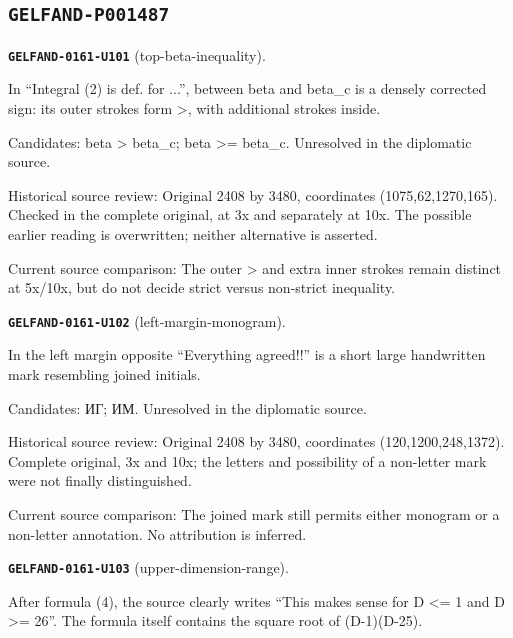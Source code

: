 \subsection*{\texttt{GELFAND-P001487}}
\par\noindent\leavevmode{}\label{GELFAND-0161-U101}\label{GELFAND-P001487:top-beta-inequality}\textbf{\texttt{GELFAND-0161-U101}} (top-beta-inequality).\nopagebreak[4]\par
In “Integral (2) is def. for ...”, between beta and beta\_c is a densely corrected sign: its outer strokes form >, with additional strokes inside.\par
Candidates: beta > beta\_c; beta >= beta\_c. Unresolved in the diplomatic source.\par
Historical source review: Original 2408 by 3480, coordinates (1075,62,1270,165). Checked in the complete original, at 3x and separately at 10x. The possible earlier reading is overwritten; neither alternative is asserted.\par
Current source comparison: The outer > and extra inner strokes remain distinct at 5x/10x, but do not decide strict versus non-strict inequality.\par\medskip
\par\noindent\leavevmode{}\label{GELFAND-0161-U102}\label{GELFAND-P001487:left-margin-monogram}\textbf{\texttt{GELFAND-0161-U102}} (left-margin-monogram).\nopagebreak[4]\par
In the left margin opposite “Everything agreed!!” is a short large handwritten mark resembling joined initials.\par
Candidates: ИГ; ИМ. Unresolved in the diplomatic source.\par
Historical source review: Original 2408 by 3480, coordinates (120,1200,248,1372). Complete original, 3x and 10x; the letters and possibility of a non-letter mark were not finally distinguished.\par
Current source comparison: The joined mark still permits either monogram or a non-letter annotation. No attribution is inferred.\par\medskip
\par\noindent\leavevmode{}\label{GELFAND-0161-U103}\label{GELFAND-P001487:upper-dimension-range}\textbf{\texttt{GELFAND-0161-U103}} (upper-dimension-range).\nopagebreak[4]\par
After formula (4), the source clearly writes “This makes sense for D <= 1 and D >= 26”. The formula itself contains the square root of (D-1)(D-25).\par
